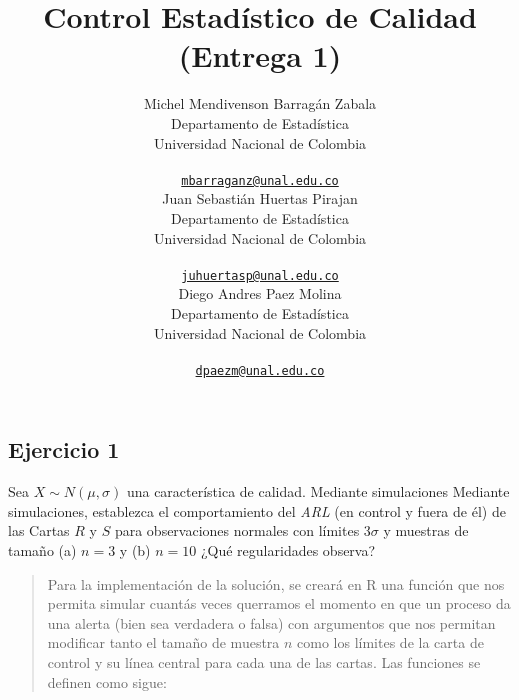 \documentclass{article}
\title{Control Estadístico de Calidad (Entrega 1)}
\author{
    Michel Mendivenson Barragán Zabala
   \\
    Departamento de Estadística \\
    Universidad Nacional de Colombia \\
   \\
  \texttt{\href{mailto:mbarraganz@unal.edu.co}{\nolinkurl{mbarraganz@unal.edu.co}}} \\
   \And
    Juan Sebastián Huertas Pirajan
   \\
    Departamento de Estadística \\
    Universidad Nacional de Colombia \\
   \\
  \texttt{\href{mailto:juhuertasp@unal.edu.co}{\nolinkurl{juhuertasp@unal.edu.co}}} \\
   \And
    Diego Andres Paez Molina
   \\
    Departamento de Estadística \\
    Universidad Nacional de Colombia \\
   \\
  \texttt{\href{mailto:dpaezm@unal.edu.co}{\nolinkurl{dpaezm@unal.edu.co}}} \\
  }
\renewenvironment{abstract}{}{}
\begin{document}
\maketitle


\begin{abstract}

\end{abstract}


\hypertarget{ejercicio-1}{%
\subsection{Ejercicio 1}\label{ejercicio-1}}

Sea \(X \sim N(\mu, \sigma)\) una característica de calidad. Mediante
simulaciones Mediante simulaciones, establezca el comportamiento del
\emph{ARL} (en control y fuera de él) de las Cartas \(R\) y \(S\) para
observaciones normales con límites \(3\sigma\) y muestras de tamaño (a)
\(n = 3\) y (b) \(n = 10\) ¿Qué regularidades observa?

\begin{quote}
\small Para la implementación de la solución, se creará en R una función
que nos permita simular cuantás veces querramos el momento en que un
proceso da una alerta (bien sea verdadera o falsa) con argumentos que
nos permitan modificar tanto el tamaño de muestra \(n\) como los límites
de la carta de control y su línea central para cada una de las cartas.
Las funciones se definen como sigue:
\end{quote}

\scriptsize
\end{document}
